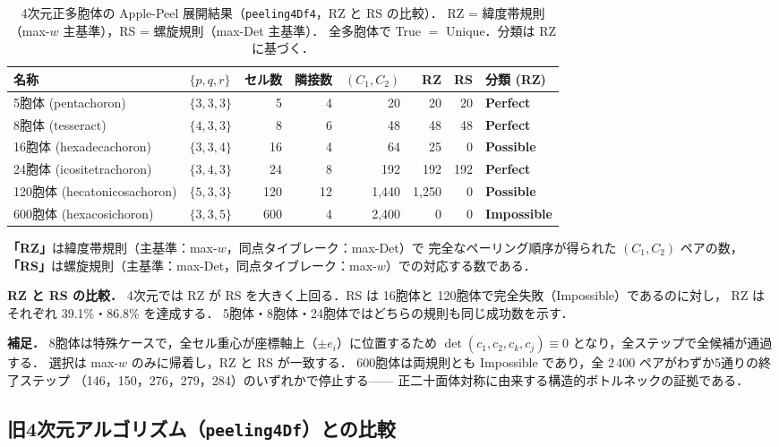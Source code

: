 \documentclass[12pt,a4paper]{article}
\theoremstyle{definition}
\begin{document}
\begin{table}[h]
\centering
\caption{4次元正多胞体の Apple-Peel 展開結果（\texttt{peeling4Df4}，RZ と RS の比較）．
  RZ = 緯度帯規則（max-$w$ 主基準），RS = 螺旋規則（max-Det 主基準）．
  全多胞体で True $=$ Unique．分類は RZ に基づく．}
\label{tab:results}
\small
\setlength{\tabcolsep}{3pt}
\begin{tabular}{llrrrrrl}
\toprule
名称 & $\{p,q,r\}$ & セル数 & 隣接数 & $(C_1,C_2)$ & RZ & RS & 分類 (RZ) \\
\midrule
5胞体 (pentachoron)           & $\{3,3,3\}$ &   5 &  4 &    20   &     20 &     20 & \textbf{Perfect}    \\
8胞体 (tesseract)             & $\{4,3,3\}$ &   8 &  6 &    48   &     48 &     48 & \textbf{Perfect}    \\
16胞体 (hexadecachoron)       & $\{3,3,4\}$ &  16 &  4 &    64   &     25 &      0 & \textbf{Possible}   \\
24胞体 (icositetrachoron)     & $\{3,4,3\}$ &  24 &  8 &   192   &    192 &    192 & \textbf{Perfect}    \\
120胞体 (hecatonicosachoron)  & $\{5,3,3\}$ & 120 & 12 & 1{,}440 & 1{,}250 &      0 & \textbf{Possible}   \\
600胞体 (hexacosichoron)      & $\{3,3,5\}$ & 600 &  4 & 2{,}400 &      0 &      0 & \textbf{Impossible} \\
\bottomrule
\end{tabular}
\end{table}

\noindent
\textbf{「RZ」}は緯度帯規則（主基準：max-$w$，同点タイブレーク：max-Det）で
完全なペーリング順序が得られた $(C_1, C_2)$ ペアの数，
\textbf{「RS」}は螺旋規則（主基準：max-Det，同点タイブレーク：max-$w$）での対応する数である．

\smallskip\noindent
\textbf{RZ と RS の比較．}
4次元では RZ が RS を大きく上回る．RS は 16胞体と 120胞体で完全失敗（Impossible）であるのに対し，
RZ はそれぞれ 39.1\%・86.8\% を達成する．
5胞体・8胞体・24胞体ではどちらの規則も同じ成功数を示す．

\smallskip\noindent
\textbf{補足．}
8胞体は特殊ケースで，全セル重心が座標軸上（$\pm e_i$）に位置するため
$\det(c_1,c_2,c_k,c_j)\equiv 0$ となり，全ステップで全候補が通過する．
選択は max-$w$ のみに帰着し，RZ と RS が一致する．
600胞体は両規則とも Impossible であり，全 2\,400 ペアがわずか5通りの終了ステップ
（146，150，276，279，284）のいずれかで停止する——
正二十面体対称に由来する構造的ボトルネックの証拠である．

\subsection{旧4次元アルゴリズム（\texttt{peeling4Df}）との比較}
\label{ssec:res4dcomp}
\end{document}

